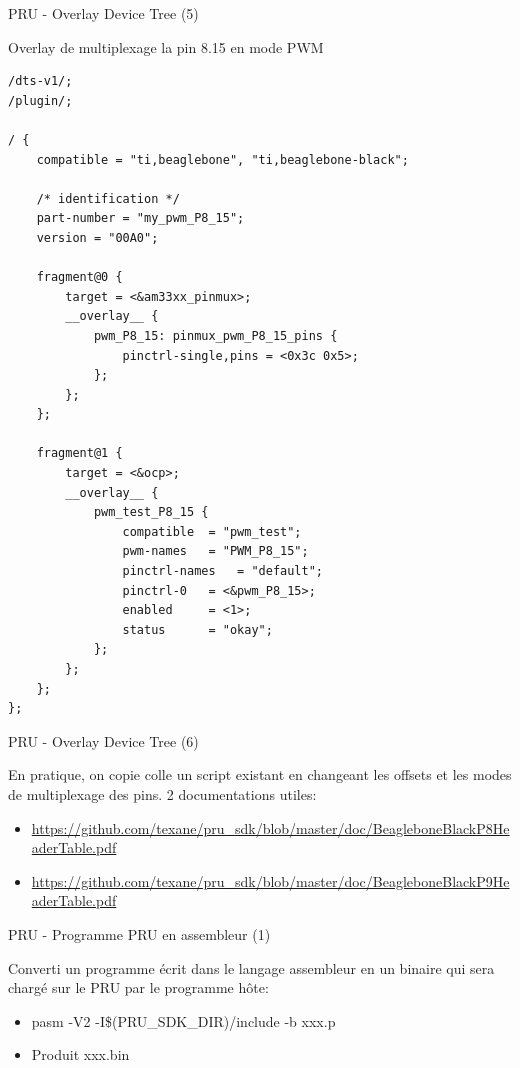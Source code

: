 \documentclass{beamer}
\begin{document}
\begin{frame}[containsverbatim]{PRU - Overlay Device Tree (5)}
  \begin{tiny}
    Overlay de multiplexage la pin 8.15 en mode PWM
  \end{tiny}
  \lstset{language=C++}
  \begin{lstlisting}[frame=tb]
/dts-v1/;
/plugin/;

/ {
	compatible = "ti,beaglebone", "ti,beaglebone-black";

	/* identification */
	part-number = "my_pwm_P8_15";
	version = "00A0";

	fragment@0 {
		target = <&am33xx_pinmux>;
		__overlay__ {
			pwm_P8_15: pinmux_pwm_P8_15_pins {
				pinctrl-single,pins = <0x3c 0x5>;
			};
		};
	};

	fragment@1 {
		target = <&ocp>;
		__overlay__ {
			pwm_test_P8_15 {
				compatible	= "pwm_test";
				pwm-names 	= "PWM_P8_15";
				pinctrl-names	= "default";
				pinctrl-0	= <&pwm_P8_15>;
				enabled		= <1>;
				status 		= "okay";
			};
		};
	};
};
  \end{lstlisting}
\end{frame}


\begin{frame}{PRU - Overlay Device Tree (6)}
  \begin{small}
    En pratique, on copie colle un script existant en changeant les offsets
    et les modes de multiplexage des pins. 2 documentations utiles:
    \begin{itemize}
    \item \begin{tiny} \url{https://github.com/texane/pru_sdk/blob/master/doc/BeagleboneBlackP8HeaderTable.pdf} \end{tiny}
    \item \begin{tiny} \url{https://github.com/texane/pru_sdk/blob/master/doc/BeagleboneBlackP9HeaderTable.pdf} \end{tiny}
    \end{itemize}
  \end{small}
\end{frame}


\begin{frame}{PRU - Programme PRU en assembleur (1)}
  \begin{small}
    Converti un programme \'ecrit dans le langage assembleur
    en un binaire qui sera charg\'e sur le PRU par le programme
    h\^ote:
    \begin{itemize}
    \item pasm -V2 -I\$(PRU\_SDK\_DIR)/include -b xxx.p
    \item Produit xxx.bin
    \end{itemize}
  \end{small}
\end{frame}
\end{document}
